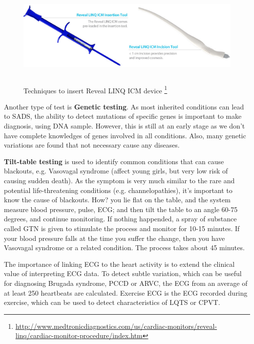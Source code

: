 \begin{figure}[hbt]
 \centerline{\includegraphics[height=5cm]{./images/Reveal_devices.eps}}
 \caption{Techniques to insert Reveal LINQ ICM device
 \footnote{\url{http://www.medtronicdiagnostics.com/us/cardiac-monitors/reveal-linq/cardiac-monitor-procedure/index.htm}}}
\label{fig:Reveal_LINQ_ICM}
\end{figure}

Another type of test is {\bf Genetic testing}. As most inherited conditions
can lead to SADS, the ability to detect mutations of specific genes is important
to make diagnosis, using DNA sample. However, this is still at an early stage as
we don't have complete knowledges of genes involved in all conditions. Also,
many genetic variations are found that not necessary cause any diseases.

{\bf Tilt-table testing} is used to identify common conditions that can cause
blackouts, e.g. Vasovagal syndrome (affect young girls, but very low risk of
causing sudden death). As the symptom is very much similar to the rare and
potential life-threatening conditions (e.g. channelopathies), it's important to
know the cause of blackouts. How? you lie flat on the table, and the system
measure blood pressure, pulse, ECG; and then tilt the table to an angle 60-75
degrees, and continue monitoring. If nothing happended, a spray of substance
called GTN is given to stimulate the process and monitor for 10-15 minutes. If
your blood pressure falls at the time you suffer the change, then you have
Vasovagal syndrome or a related condition. The process takes about 45 minutes.

The importance of linking ECG to the heart activity is to extend the clinical
value of interpreting ECG data. To detect subtle variation, which can be useful
for diagnosing Brugada syndrome, PCCD or ARVC, the ECG from an average of at
least 250 heartbeats are calculated. Exercise ECG is the ECG recorded during
exercise, which can be used to detect characteristics of LQTS or CPVT.

